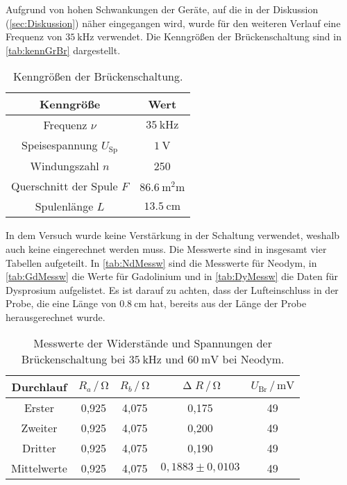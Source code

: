 \noindent
Aufgrund von hohen Schwankungen der Geräte, auf die in der Diskussion (\autoref{sec:Diskussion}) näher eingegangen wird, wurde für den weiteren Verlauf eine Frequenz von $\SI{35}{\kilo\hertz}$ verwendet.
Die Kenngrößen der Brückenschaltung sind in \autoref{tab:kennGrBr} dargestellt. 
\begin{table}[H]
  \centering
  \caption{Kenngrößen der Brückenschaltung.}
  \label{tab:kennGrBr}
  \begin{tabular}{c c}
    \toprule
    Kenngröße & Wert \\
    \midrule
    Frequenz $\nu$ & $\SI{35}{\kilo\hertz}$ \\
    Speisespannung $U_{\text{Sp}}$ & $\SI{1}{\volt}$ \\
    Windungszahl $n$ & 250 \\
    Querschnitt der Spule $F$ & $\SI{86,6}{\square\milli\meter}$ \\
    Spulenlänge $L$ & $\SI{13,5}{\centi\meter}$ \\
    \bottomrule
  \end{tabular}
\end{table}

\noindent
In dem Versuch wurde keine Verstärkung in der Schaltung verwendet, weshalb auch keine eingerechnet werden muss.
Die Messwerte sind in insgesamt vier Tabellen aufgeteilt. In \autoref{tab:NdMessw} sind die Messwerte für Neodym, in \autoref{tab:GdMessw} die Werte für Gadolinium und in \autoref{tab:DyMessw} die Daten für Dysprosium aufgelistet.
Es ist darauf zu achten, dass der Lufteinschluss in der Probe, die eine Länge von $\SI{0,8}{\centi\meter}$ hat, bereits aus der Länge der Probe herausgerechnet wurde.
\begin{table}[H]
  \centering
  \caption{Messwerte der Widerstände und Spannungen der Brückenschaltung bei $\SI{35}{\kilo\hertz}$ und $\SI{60}{\milli\volt}$ bei Neodym.}
  \label{tab:NdMessw}
  \begin{tabular}{c| c c c c}
    \toprule
    Durchlauf & $R_a \,/\, \si{\ohm}$ & $R_b \,/\, \si{\ohm}$ & $\upDelta R \,/\, \si{\ohm}$ & $U_{\text{Br}} \,/\, \si{\milli\volt}$ \\%
    \midrule
    Erster & 0,925 & 4,075 & 0,175 & 49 \\
    Zweiter & 0,925 & 4,075 & 0,200 & 49 \\
    Dritter & 0,925 & 4,075 & 0,190 & 49 \\
    Mittelwerte & 0,925 & 4,075 & $0,1883 \pm 0,0103$ & 49\\
    \bottomrule
  \end{tabular}
\end{table}

